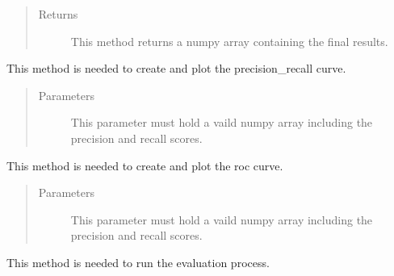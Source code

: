 \documentclass[letterpaper,10pt,english,openany,oneside]{sphinxmanual}
\begin{document}
\begin{fulllineitems}
\begin{fulllineitems}
\begin{quote}
\begin{description}
\item[{Returns}] \leavevmode
This method returns a numpy array containing the final results.

\end{description}\end{quote}

\end{fulllineitems}


\begin{fulllineitems}
\label{\detokenize{Evaluation:sbd.Evaluation.Evaluation.plotPRCurve}}
This method is needed to create and plot the precision\_recall curve.
\begin{quote}\begin{description}
\item[{Parameters}] \leavevmode
{} \textendash{} This parameter must hold a vaild numpy array including the precision and recall scores.

\end{description}\end{quote}

\end{fulllineitems}


\begin{fulllineitems}
\label{\detokenize{Evaluation:sbd.Evaluation.Evaluation.plotROCCurve}}
This method is needed to create and plot the roc curve.
\begin{quote}\begin{description}
\item[{Parameters}] \leavevmode
{} \textendash{} This parameter must hold a vaild numpy array including the precision and recall scores.

\end{description}\end{quote}

\end{fulllineitems}


\begin{fulllineitems}
\label{\detokenize{Evaluation:sbd.Evaluation.Evaluation.run}}
This method is needed to run the evaluation process.

\end{fulllineitems}


\end{fulllineitems}
\end{document}
